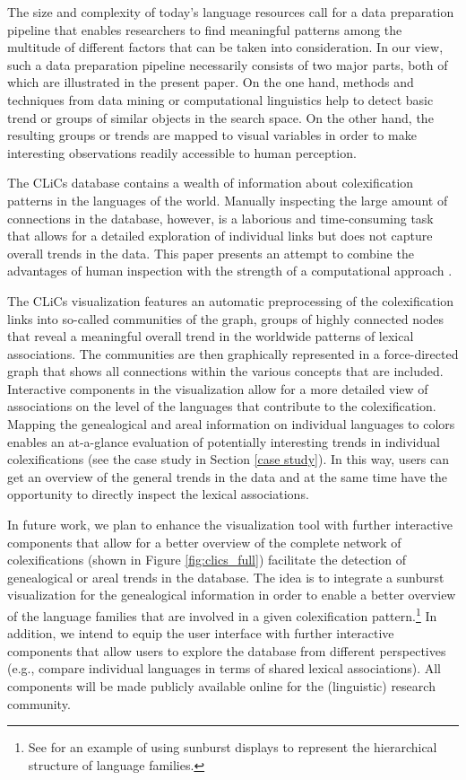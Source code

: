 \documentclass[10pt, a4paper]{article}
\begin{document}
The size and complexity of today's language resources call for a data preparation pipeline that enables researchers to find meaningful patterns among the multitude of different factors that can be taken into consideration. In our view, such a data preparation pipeline necessarily consists of two major parts, both of which are illustrated in the present paper. On the one hand, methods and techniques from data mining or computational linguistics help to detect basic trend or groups of similar objects in the search space. On the other hand, the resulting groups or trends are mapped to visual variables in order to make interesting observations readily accessible to human perception. 

The CLiCs database contains a wealth of information about colexification patterns in the languages of the world. Manually inspecting the large amount of connections in the database, however, is a laborious and time-consuming task that allows for a detailed exploration of individual links but does not capture overall trends in the data. This paper presents an attempt to combine the advantages of human inspection with the strength of a computational approach \cite{Keim2008}. 

The CLiCs visualization features an automatic preprocessing of the colexification links into so-called communities of the graph, groups of highly connected nodes that reveal a meaningful overall trend in the worldwide patterns of lexical associations. The communities are then graphically represented in a force-directed graph that shows all connections within the various concepts that are included. Interactive components in the visualization allow for a more detailed view of associations on the level of the languages that contribute to the colexification. 
Mapping the genealogical and areal information on individual languages to colors enables an at-a-glance evaluation of potentially interesting trends in individual colexifications (see the case study in Section \ref{case study}). 
In this way, users can get an overview of the general trends in the data and at the same time have the opportunity to directly inspect the lexical associations. 

In future work, we plan to enhance the visualization tool with further interactive components that allow for a better overview of the complete network of colexifications (shown in Figure \ref{fig:clics_full}) facilitate the detection of genealogical or areal trends in the database. The idea is to integrate a sunburst visualization \cite{Sunburst}  for the genealogical information in order to enable a better overview of the language families that are involved in a given colexification pattern.\footnote{See \cite{MayerLanguageExplorer} for an example of using sunburst displays to represent the hierarchical structure of language families.} In addition, we intend to equip the user interface with further interactive components that allow users to explore the database from different perspectives (e.g., compare individual languages in terms of shared lexical associations). All components will be made publicly available online for the (linguistic) research community. 




\end{document}
